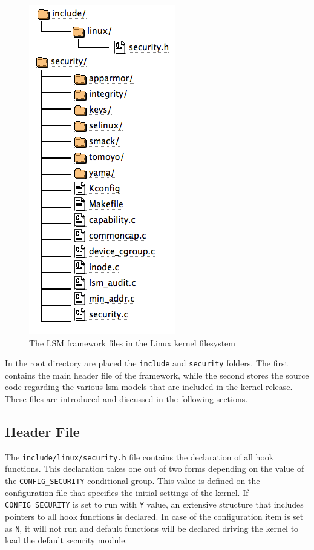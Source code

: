 \begin{figure}[h]
 \centering
 \includegraphics[scale=0.5]{figures/lsm_kernel_files.png}
 \caption{ The LSM framework files in the Linux kernel filesystem}
 \label{fig:kernel_files}
\end{figure}

In the root directory are placed the \texttt{include} and \texttt{security} folders. The first contains the main header file of the framework, while the second stores the source code regarding the various \gls{lsm} models that are included in the kernel release. These files are introduced and discussed in the following sections.

\subsection{Header File}
\label{sec:header_file}

The \texttt{include/linux/security.h} file contains the declaration of all hook functions. This declaration takes one out of two forms depending on the value of the \texttt{CONFIG\_SECURITY} conditional group. This value is defined on the configuration file that specifies the initial settings of the kernel. If \texttt{CONFIG\_SECURITY} is set to run with \texttt{Y} value, an extensive structure that includes pointers to all hook functions is declared. In case of the configuration item is set as \texttt{N}, it will not run and default functions will be declared driving the kernel to load the default security module.

